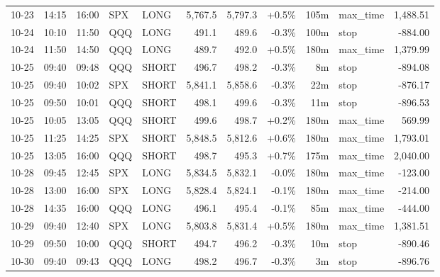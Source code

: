 \documentclass[11pt,a4paper,twoside]{article}
\begin{document}
\begin{center}
\begin{longtable}{>{\color{txtmain}}l l l l l r r r r >{\color{txtmain}}l r}
10-23 & 14:15 & 16:00 & SPX & LONG & 5,767.5 & 5,797.3 & \textcolor{wingreen}{+0.5\%} & 105m & max\_time & \textcolor{wingreen}{1,488.51} \\
10-24 & 10:10 & 11:50 & QQQ & LONG & 491.1 & 489.6 & \textcolor{lossred}{-0.3\%} & 100m & stop & \textcolor{lossred}{-884.00} \\
10-24 & 11:50 & 14:50 & QQQ & LONG & 489.7 & 492.0 & \textcolor{wingreen}{+0.5\%} & 180m & max\_time & \textcolor{wingreen}{1,379.99} \\
10-25 & 09:40 & 09:48 & QQQ & SHORT & 496.7 & 498.2 & \textcolor{lossred}{-0.3\%} & 8m & stop & \textcolor{lossred}{-894.08} \\
10-25 & 09:40 & 10:02 & SPX & SHORT & 5,841.1 & 5,858.6 & \textcolor{lossred}{-0.3\%} & 22m & stop & \textcolor{lossred}{-876.17} \\
10-25 & 09:50 & 10:01 & QQQ & SHORT & 498.1 & 499.6 & \textcolor{lossred}{-0.3\%} & 11m & stop & \textcolor{lossred}{-896.53} \\
10-25 & 10:05 & 13:05 & QQQ & SHORT & 499.6 & 498.7 & \textcolor{wingreen}{+0.2\%} & 180m & max\_time & \textcolor{wingreen}{569.99} \\
10-25 & 11:25 & 14:25 & SPX & SHORT & 5,848.5 & 5,812.6 & \textcolor{wingreen}{+0.6\%} & 180m & max\_time & \textcolor{wingreen}{1,793.01} \\
10-25 & 13:05 & 16:00 & QQQ & SHORT & 498.7 & 495.3 & \textcolor{wingreen}{+0.7\%} & 175m & max\_time & \textcolor{wingreen}{2,040.00} \\
10-28 & 09:45 & 12:45 & SPX & LONG & 5,834.5 & 5,832.1 & \textcolor{lossred}{-0.0\%} & 180m & max\_time & \textcolor{lossred}{-123.00} \\
10-28 & 13:00 & 16:00 & SPX & LONG & 5,828.4 & 5,824.1 & \textcolor{lossred}{-0.1\%} & 180m & max\_time & \textcolor{lossred}{-214.00} \\
10-28 & 14:35 & 16:00 & QQQ & LONG & 496.1 & 495.4 & \textcolor{lossred}{-0.1\%} & 85m & max\_time & \textcolor{lossred}{-444.00} \\
10-29 & 09:40 & 12:40 & SPX & LONG & 5,803.8 & 5,831.4 & \textcolor{wingreen}{+0.5\%} & 180m & max\_time & \textcolor{wingreen}{1,381.51} \\
10-29 & 09:50 & 10:00 & QQQ & SHORT & 494.7 & 496.2 & \textcolor{lossred}{-0.3\%} & 10m & stop & \textcolor{lossred}{-890.46} \\
10-30 & 09:40 & 09:43 & QQQ & LONG & 498.2 & 496.7 & \textcolor{lossred}{-0.3\%} & 3m & stop & \textcolor{lossred}{-896.76} \\

\end{longtable}
\end{center}
\end{document}
